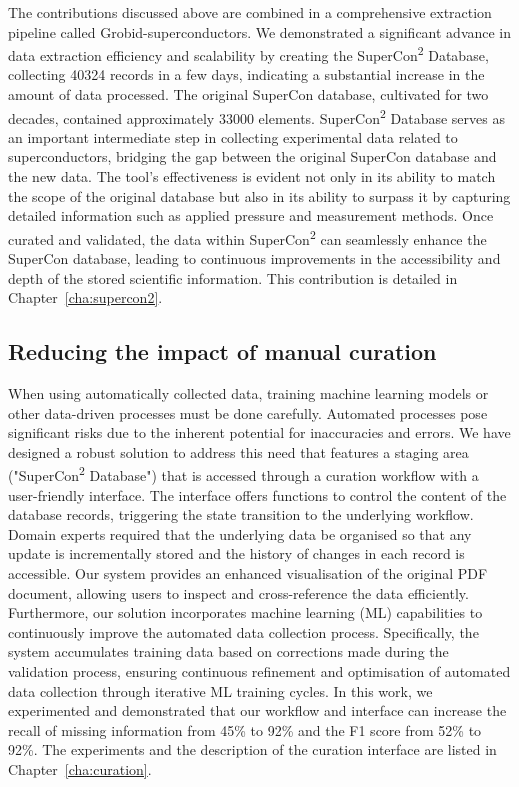 The contributions discussed above are combined in a comprehensive extraction pipeline called Grobid-superconductors.
We demonstrated a significant advance in data extraction efficiency and scalability by creating the SuperCon\textsuperscript{2} Database, collecting 40324 records in a few days, indicating a substantial increase in the amount of data processed.
The original SuperCon database, cultivated for two decades, contained approximately 33000 elements.
SuperCon\textsuperscript{2} Database serves as an important intermediate step in collecting experimental data related to superconductors, bridging the gap between the original SuperCon database and the new data. 
The tool's effectiveness is evident not only in its ability to match the scope of the original database but also in its ability to surpass it by capturing detailed information such as applied pressure and measurement methods. 
Once curated and validated, the data within SuperCon\textsuperscript{2} can seamlessly enhance the SuperCon database, leading to continuous improvements in the accessibility and depth of the stored scientific information.
This contribution is detailed in Chapter~\ref{cha:supercon2}.

\subsection{Reducing the impact of manual curation}
\label{sec:intro-curation}

When using automatically collected data, training machine learning models or other data-driven processes must be done carefully. 
Automated processes pose significant risks due to the inherent potential for inaccuracies and errors.
We have designed a robust solution to address this need that features a staging area ("SuperCon\textsuperscript{2} Database") that is accessed through a curation workflow with a user-friendly interface. 
The interface offers functions to control the content of the database records, triggering the state transition to the underlying workflow. 
Domain experts required that the underlying data be organised so that any update is incrementally stored and the history of changes in each record is accessible. 
Our system provides an enhanced visualisation of the original PDF document, allowing users to inspect and cross-reference the data efficiently. 
Furthermore, our solution incorporates machine learning (ML) capabilities to continuously improve the automated data collection process. 
Specifically, the system accumulates training data based on corrections made during the validation process, ensuring continuous refinement and optimisation of automated data collection through iterative ML training cycles.
In this work, we experimented and demonstrated that our workflow and interface can increase the recall of missing information from 45\% to 92\% and the F1 score from 52\% to 92\%. 
The experiments and the description of the curation interface are listed in Chapter~\ref{cha:curation}.